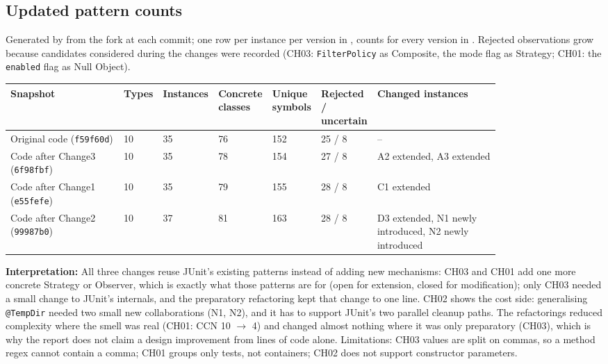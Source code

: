 \documentclass[11pt,a4paper]{article}
\newcommand{\entry}[1]{\textbf{#1:} }
\begin{document}
\subsection{Updated pattern counts}
Generated by  from the fork at each commit; one row per instance per version in , counts for every version in . Rejected observations grow because candidates considered during the changes were recorded (CH03: \texttt{FilterPolicy} as Composite, the mode flag as Strategy; CH01: the \texttt{enabled} flag as Null Object).

\begin{longtable}{@{}p{0.23\linewidth}p{0.05\linewidth}p{0.07\linewidth}p{0.07\linewidth}p{0.07\linewidth}p{0.08\linewidth}p{0.25\linewidth}@{}}\toprule
Snapshot & Types & Instances & Concrete classes & Unique symbols & Rejected / uncertain & Changed instances\\\midrule\endhead
Original code (\texttt{f59f60d}) & 10 & 35 & 76 & 152 & 25 / 8 & --\\
Code after Change3 (\texttt{6f98fbf}) & 10 & 35 & 78 & 154 & 27 / 8 & A2 extended, A3 extended\\
Code after Change1 (\texttt{e55fefe}) & 10 & 35 & 79 & 155 & 28 / 8 & C1 extended\\
Code after Change2 (\texttt{99987b0}) & 10 & 37 & 81 & 163 & 28 / 8 & D3 extended, N1 newly introduced, N2 newly introduced\\
\bottomrule\end{longtable}

\entry{Interpretation}All three changes reuse JUnit's existing patterns instead of adding new mechanisms: CH03 and CH01 add one more concrete Strategy or Observer, which is exactly what those patterns are for (open for extension, closed for modification); only CH03 needed a small change to JUnit's internals, and the preparatory refactoring kept that change to one line. CH02 shows the cost side: generalising \texttt{@TempDir} needed two small new collaborations (N1, N2), and it has to support JUnit's two parallel cleanup paths. The refactorings reduced complexity where the smell was real (CH01: CCN 10 $\rightarrow$ 4) and changed almost nothing where it was only preparatory (CH03), which is why the report does not claim a design improvement from lines of code alone. Limitations: CH03 values are split on commas, so a method regex cannot contain a comma; CH01 groups only tests, not containers; CH02 does not support constructor parameters.
\end{document}
